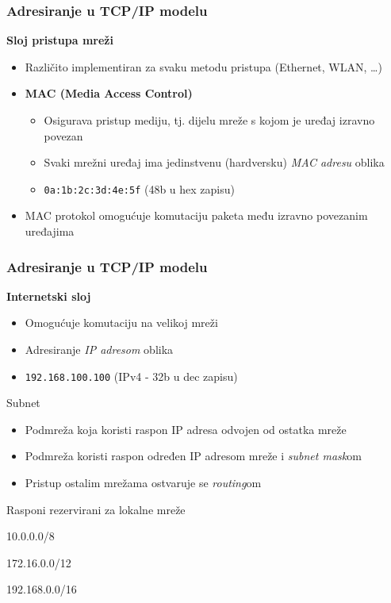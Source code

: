 \documentclass[t,table,usenames,dvipsnames]{beamer}
\begin{document}
\begin{frame}
	\frametitle{Adresiranje u TCP/IP modelu}
	\textbf{Sloj pristupa mreži}
	\begin{itemize}
		\item Različito implementiran za svaku metodu pristupa (Ethernet, WLAN, \dots)
		\item \textbf{MAC (Media Access Control)}
		\begin{itemize}
			\item Osigurava pristup mediju, tj. dijelu mreže s kojom je uređaj izravno povezan
			\item Svaki mrežni uređaj ima jedinstvenu (hardversku) \emph{MAC adresu} oblika
			\item[] \texttt{0a:1b:2c:3d:4e:5f} \hfill (48b u hex zapisu) \hfill \,
		\end{itemize}
		\item MAC protokol omogućuje komutaciju paketa među izravno povezanim uređajima
	\end{itemize}
\end{frame}

\begin{frame}
	\frametitle{Adresiranje u TCP/IP modelu}
	\textbf{Internetski sloj}
	\begin{itemize}
		\item Omogućuje komutaciju na velikoj mreži
		\item Adresiranje \emph{IP adresom} oblika
		\item[] \texttt{192.168.100.100} \hfill (IPv4 - 32b u dec zapisu) \hfill \,
	\end{itemize}
	Subnet
	\begin{itemize}
		\item Podmreža koja koristi raspon IP adresa odvojen od ostatka mreže
		\item Podmreža koristi raspon određen IP adresom mreže i \emph{subnet mask}om
		\item Pristup ostalim mrežama ostvaruje se \emph{routing}om
	\end{itemize}
	\begin{itemize}
		\item Rasponi rezervirani za lokalne mreže
		{\ttfamily
			\item[] 10.0.0.0/8
			\item[] 172.16.0.0/12
			\item[] 192.168.0.0/16
		}
		
	\end{itemize}
\end{frame}
\end{document}
